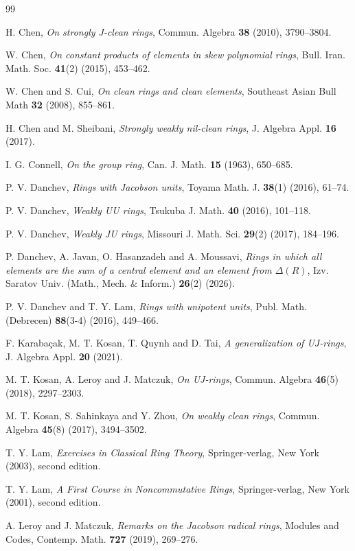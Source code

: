 \documentclass[12pt]{amsart}
\theoremstyle{definition}
\begin{document}
\begin{thebibliography}{99}
	
H. Chen, {\it On strongly J-clean rings}, Commun. Algebra {\bf 38} (2010), 3790--3804.	

W. Chen, {\it On constant products of elements in skew polynomial rings}, Bull. Iran. Math. Soc. {\bf 41}(2) (2015), 453--462.

W. Chen and S. Cui, {\it On clean rings and clean elements}, Southeast Asian Bull Math {\bf 32} (2008), 855--861.

H. Chen and M. Sheibani, {\it Strongly weakly nil-clean rings}, J. Algebra Appl. {\bf 16} (2017).

I. G. Connell, {\it On the group ring}, Can. J. Math. {\bf 15} (1963), 650--685.

P. V. Danchev, {\it Rings with Jacobson units}, Toyama Math. J. {\bf 38}(1) (2016), 61--74.

P. V. Danchev, {\it Weakly UU rings}, Tsukuba J. Math. {\bf 40} (2016), 101--118.

P. V. Danchev, {\it Weakly JU rings},  Missouri J. Math. Sci. {\bf 29}(2) (2017), 184--196.

P. Danchev, A. Javan, O. Hasanzadeh and A. Moussavi, {\it Rings in which all elements are the sum of a central element and an element from $\Delta(R)$}, Izv. Saratov Univ. (Math., Mech. \& Inform.) {\bf 26}(2) (2026).

P. V. Danchev and T. Y. Lam, {\it Rings with unipotent units}, Publ. Math. (Debrecen) {\bf 88}(3-4) (2016), 449--466.

F. Karaba\c{c}ak, M. T. Kosan, T. Quynh and D. Tai, {\it A generalization of UJ-rings}, J. Algebra Appl. {\bf 20} (2021).

M. T. Kosan, A. Leroy and J. Matczuk, {\it On UJ-rings}, Commun. Algebra {\bf 46}(5) (2018), 2297--2303.

M. T. Kosan, S. Sahinkaya and Y. Zhou, {\it On weakly clean rings}, Commun. Algebra {\bf 45}(8) (2017), 3494--3502.

T. Y. Lam, {\it Exercises in Classical Ring Theory}, Springer-verlag, New York (2003), second edition.

T. Y. Lam, {\it A First Course in Noncommutative Rings}, Springer-verlag, New York (2001), second edition.
	
A. Leroy and J. Matczuk, {\it Remarks on the Jacobson radical rings}, Modules and Codes, Contemp. Math. {\bf 727} (2019), 269--276.


\end{thebibliography}
\end{document}
